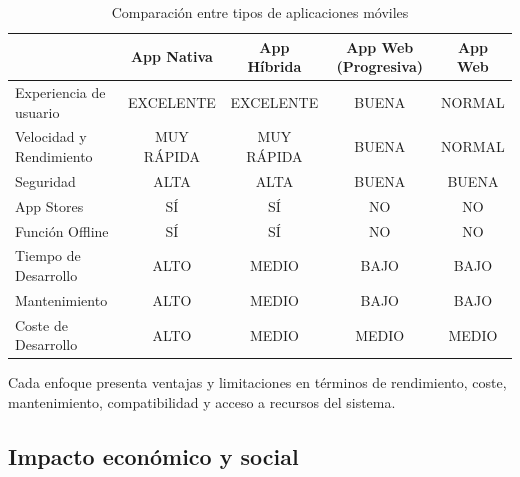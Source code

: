 
\begin{table}[htbp]
\centering
\renewcommand{\arraystretch}{1.5}
\begin{tabularx}{\textwidth}{|X|c|c|c|c|}
\hline
\textbf{} & \textbf{App Nativa} & \textbf{App Híbrida} & \textbf{App Web (Progresiva)} & \textbf{App Web} \\
\hline
Experiencia de usuario & \textcolor{verde}{EXCELENTE} & \textcolor{verde}{EXCELENTE} & \textcolor{marron}{BUENA} & \textcolor{rojo}{NORMAL} \\
\hline
Velocidad y Rendimiento & \textcolor{verde}{MUY RÁPIDA} & \textcolor{verde}{MUY RÁPIDA} & \textcolor{marron}{BUENA} & \textcolor{rojo}{NORMAL} \\
\hline
Seguridad & \textcolor{verde}{ALTA} & \textcolor{verde}{ALTA} & \textcolor{marron}{BUENA} & \textcolor{marron}{BUENA} \\
\hline
App Stores & \textcolor{verde}{SÍ} & \textcolor{verde}{SÍ} & \textcolor{rojo}{NO} & \textcolor{rojo}{NO} \\
\hline
Función Offline & \textcolor{verde}{SÍ} & \textcolor{verde}{SÍ} & \textcolor{rojo}{NO} & \textcolor{rojo}{NO} \\
\hline
Tiempo de Desarrollo & \textcolor{rojo}{ALTO} & \textcolor{marron}{MEDIO} & \textcolor{verde}{BAJO} & \textcolor{verde}{BAJO} \\
\hline
Mantenimiento & \textcolor{rojo}{ALTO} & \textcolor{marron}{MEDIO} & \textcolor{verde}{BAJO} & \textcolor{verde}{BAJO} \\
\hline
Coste de Desarrollo & \textcolor{rojo}{ALTO} & \textcolor{marron}{MEDIO} & \textcolor{marron}{MEDIO} & \textcolor{marron}{MEDIO} \\
\hline
\end{tabularx}
\caption{Comparación entre tipos de aplicaciones móviles}
\end{table}

\vspace{1em}

Cada enfoque presenta ventajas y limitaciones en términos de rendimiento, coste, mantenimiento, compatibilidad y acceso a recursos del sistema.

\subsection{Impacto económico y social}

